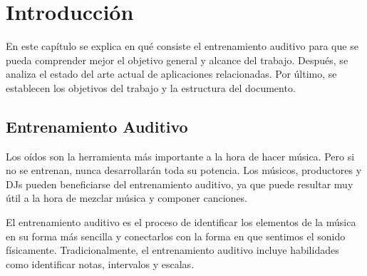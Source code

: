 \documentclass[12pt,twoside,titlepage]{report}
\begin{document}
  


\pagestyle{fancy}
\renewcommand{\chaptermark}[1]{\markboth{Capítulo \thechapter.\ #1}{}}
\pagestyle{fancy}
\fancyhf{}
\fancyhead[LO]{\leftmark}
\fancyhead[RO]{}
\fancyhead[RE]{\nouppercase\rightmark}
\fancyhead[LE]{}
\fancyfoot[C]{\thepage}


   


\chapter{Introducción}

En este capítulo se explica en qué consiste el entrenamiento auditivo para que se pueda comprender mejor el objetivo general y alcance del trabajo. Después, se analiza el estado del arte actual de aplicaciones relacionadas. Por último, se establecen los objetivos del trabajo y la estructura del documento.

\pagestyle{fancy}

\setlength{\parskip}{0.75em}
\renewcommand{\baselinestretch}{1.25}


\setcounter{page}{1}

\section{Entrenamiento Auditivo}

Los oídos son la herramienta más importante a la hora de hacer música. Pero si no se entrenan, nunca desarrollarán toda su potencia. Los músicos, productores y DJs pueden beneficiarse del entrenamiento auditivo, ya que puede resultar muy útil a la hora de mezclar música y componer canciones.

El entrenamiento auditivo es el proceso de identificar los elementos de la música en su forma más sencilla y conectarlos con la forma en que sentimos el sonido físicamente. Tradicionalmente, el entrenamiento auditivo incluye habilidades como identificar notas, intervalos y escalas. 
\end{document}
